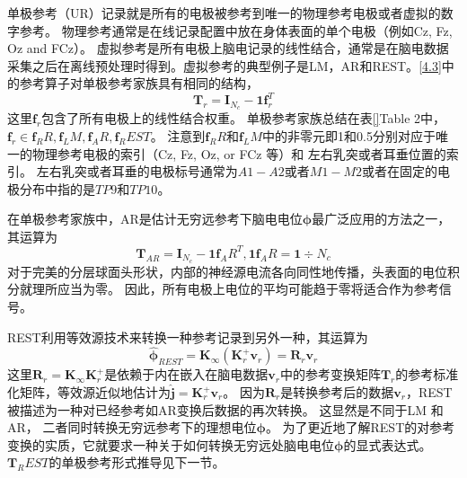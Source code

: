 单极参考（UR）记录就是所有的电极被参考到唯一的物理参考电极或者虚拟的数字参考。 物理参考通常是在线记录配置中放在身体表面的单个电极（例如Cz, Fz, Oz and FCz）。 虚拟参考是所有电极上脑电记录的线性结合，通常是在脑电数据采集之后在离线预处理时得到。虚拟参考的典型例子是LM，AR和REST。\eqref{4.3}中的参考算子对单极参考家族具有相同的结构，
\begin{equation}\label{4.4}
\mathbf{T}_{r}=\mathbf{I}_{N_c}-\mathbf{1f}_r^T
\end{equation}
这里$\mathbf{f}_r$包含了所有电极上的线性结合权重。 单极参考家族总结在表\ref{}Table 2中，$\mathbf{f}_r\in{\mathbf{f}_RR,\mathbf{f}_LM,\mathbf{f}_AR,\mathbf{f}_REST}$。 注意到$\mathbf{f}_RR$和$\mathbf{f}_LM$中的非零元即1和0.5分别对应于唯一的物理参考电极的索引（Cz, Fz, Oz, or FCz 等）和 左右乳突或者耳垂位置的索引。 左右乳突或者耳垂的电极标号通常为$A1-A2$或者$M1-M2$或者在固定的电极分布中指的是$TP9$和$TP10$。

在单极参考家族中，AR是估计无穷远参考下脑电电位$\mathbf{\phi}$最广泛应用的方法之一，其运算为
\begin{equation}\label{4.5}
\mathbf{T}_{AR}=\mathbf{I}_{N_c}-\mathbf{1f}_AR^T, \mathbf{1f}_AR=\mathbf{1}\div{N_c}
\end{equation}
对于完美的分层球面头形状，内部的神经源电流各向同性地传播，头表面的电位积分就理所应当为零。 因此，所有电极上电位的平均可能趋于零将适合作为参考信号。

REST利用等效源技术来转换一种参考记录到另外一种，其运算为
\begin{equation}\label{4.6}
\hat{\mathbf{\phi}}_{REST}=\mathbf{K}_{\infty}(\mathbf{K}_r^+\mathbf{v}_r)=\mathbf{R}_r\mathbf{v}_r
\end{equation}
这里$\mathbf{R}_r=\mathbf{K}_{\infty}\mathbf{K}_r^+$是依赖于内在嵌入在脑电数据$\mathbf{v}_r$中的参考变换矩阵$\mathbf{T}_r$的参考标准化矩阵，等效源近似地估计为$\hat{\mathbf{j}}=\mathbf{K}_r^+\mathbf{v}_r$。 因为$\mathbf{R}_r$是转换参考后的数据$\mathbf{v}_r$，REST被描述为一种对已经参考如AR变换后数据的再次转换。 这显然是不同于LM 和 AR， 二者同时转换无穷远参考下的理想电位$\mathbf{\phi}$。 为了更近地了解REST的对参考变换的实质，它就要求一种关于如何转换无穷远处脑电电位$\mathbf{\phi}$的显式表达式。 $\mathbf{T}_REST$的单极参考形式推导见下一节。

